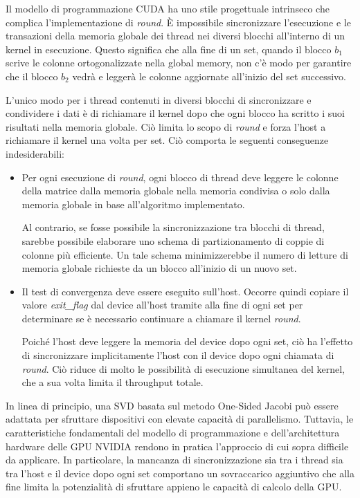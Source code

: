 \label{sec:Conclusioni}
Il modello di programmazione CUDA ha uno stile progettuale intrinseco che complica l'implementazione di \textit{round}. È impossibile sincronizzare l'esecuzione e le transazioni della memoria globale dei thread nei diversi blocchi all'interno di un kernel in esecuzione. Questo significa che alla fine di un set, quando il blocco $b_1$ scrive le colonne ortogonalizzate nella global memory, non c'è modo per garantire che il blocco $b_2$ vedrà e leggerà le colonne aggiornate all'inizio del set successivo.

L'unico modo per i thread contenuti in diversi blocchi di sincronizzare e condividere i dati è di richiamare il kernel dopo che ogni blocco ha scritto i suoi risultati nella memoria globale. Ciò limita lo scopo di \textit{round} e forza l'host a richiamare il kernel una volta per set. Ciò comporta le seguenti conseguenze indesiderabili:
\begin{itemize}
	\item Per ogni esecuzione di \textit{round}, ogni blocco di thread deve leggere le colonne della matrice dalla memoria globale nella memoria condivisa o solo dalla memoria globale in base all'algoritmo implementato.
	
	
	Al contrario, se fosse possibile la sincronizzazione tra blocchi di thread, sarebbe possibile elaborare uno schema di partizionamento di coppie di colonne più efficiente. Un tale schema minimizzerebbe il numero di letture di memoria globale richieste da un blocco all'inizio di un nuovo set.
	
	\item Il test di convergenza deve essere eseguito sull'host. Occorre quindi copiare il valore \textit{exit\_flag} dal device all'host tramite  alla fine di ogni set per determinare se è necessario continuare a chiamare il kernel \textit{round}. 
	
	Poiché l'host deve leggere la memoria del device dopo ogni set, ciò ha l'effetto di sincronizzare implicitamente l'host con il device dopo ogni chiamata di \textit{round}. Ciò riduce di molto le possibilità di esecuzione simultanea del kernel, che a sua volta limita il throughput totale.
\end{itemize}
In linea di principio, una SVD basata sul metodo One-Sided Jacobi può essere adattata per sfruttare dispositivi con elevate capacità di parallelismo. Tuttavia, le caratteristiche fondamentali del modello di programmazione e dell'architettura hardware delle GPU NVIDIA rendono in pratica l'approccio di cui sopra difficile da applicare. In particolare, la mancanza di sincronizzazione sia tra i thread sia tra l'host e il device dopo ogni set comportano un sovraccarico aggiuntivo che alla fine limita la potenzialità di sfruttare appieno le capacità di calcolo della GPU.\cite{Romer:SVD}

